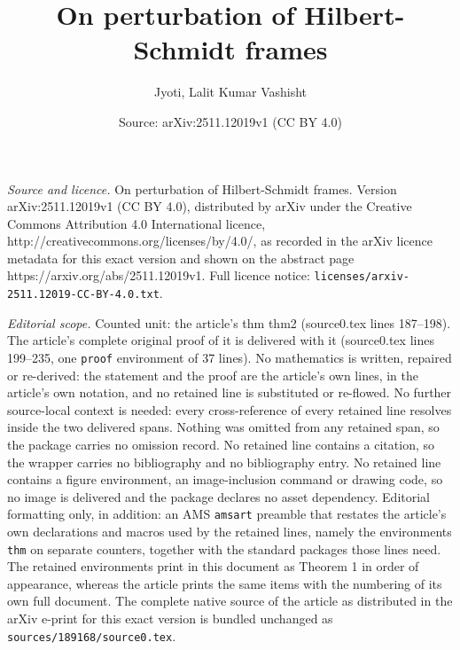 \documentclass[10pt,a4paper]{amsart}
\title{On perturbation of Hilbert-Schmidt frames}
\author{Jyoti, Lalit Kumar Vashisht}
\date{Source: arXiv:2511.12019v1 (CC BY 4.0)}
\begin{document}
\maketitle

\noindent\emph{Source and licence.} On perturbation of Hilbert-Schmidt frames. Version arXiv:2511.12019v1 (CC BY 4.0), distributed by arXiv under the Creative Commons Attribution 4.0 International licence, http://creativecommons.org/licenses/by/4.0/, as recorded in the arXiv licence metadata for this exact version and shown on the abstract page https://arxiv.org/abs/2511.12019v1. Full licence notice: \texttt{licenses/arxiv-2511.12019-CC-BY-4.0.txt}.\par\smallskip

\noindent\textit{Editorial scope.} Counted unit: the article's thm thm2 (source0.tex lines 187--198). The article's complete original proof of it is delivered with it (source0.tex lines 199--235, one \texttt{proof} environment of 37 lines). No mathematics is written, repaired or re-derived: the statement and the proof are the article's own lines, in the article's own notation, and no retained line is substituted or re-flowed.  No further source-local context is needed: every cross-reference of every retained line resolves inside the two delivered spans.  Nothing was omitted from any retained span, so the package carries no omission record.  No retained line contains a citation, so the wrapper carries no bibliography and no bibliography entry.  No retained line contains a figure environment, an image-inclusion command or drawing code, so no image is delivered and the package declares no asset dependency.  Editorial formatting only, in addition: an AMS \texttt{amsart} preamble that restates the article's own declarations and macros used by the retained lines, namely the environments \texttt{thm} on separate counters, together with the standard packages those lines need.  The retained environments print in this document as Theorem 1 in order of appearance, whereas the article prints the same items with the numbering of its own full document.  The complete native source of the article as distributed in the arXiv e-print for this exact version is bundled unchanged as \texttt{sources/189168/source0.tex}.
\end{document}
